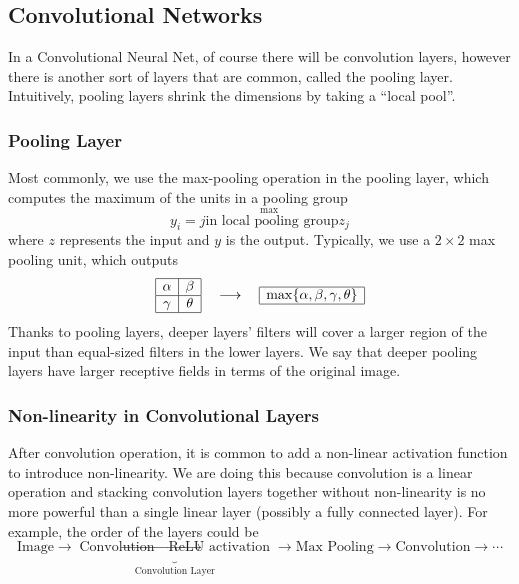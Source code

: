\documentclass[11pt]{article}
\begin{document}
\subsection{Convolutional Networks}
In a Convolutional Neural Net, of course there will be convolution layers, however there is another sort of layers that are common, called the pooling layer. Intuitively, pooling layers shrink the dimensions by taking a ``local pool''.
\subsubsection{Pooling Layer}
Most commonly, we use the max-pooling operation in the pooling layer, which computes the maximum of the units in a pooling group
\begin{equation}
    y_i = \overset{\max}{j \text{in local pooling group}}z_j
\end{equation}
where $z$ represents the input and $y$ is the output. Typically, we use a $2\times 2$ max pooling unit, which outputs
\begin{equation}
    \begin{array}{|c|c|}
        \hline
        \alpha & \beta \\
        \hline
        \gamma & \theta \\
        \hline
    \end{array} 
    \quad \longrightarrow
    \quad
    \begin{array}{|c|}
        \hline
            \max\{\alpha, \beta, \gamma, \theta\} \\
        \hline
    \end{array}
\end{equation}
Thanks to pooling layers, deeper layers' filters will cover a larger region of the input than equal-sized filters in the lower layers. We say that deeper pooling layers have larger receptive fields in terms of the original image. 

\subsubsection{Non-linearity in Convolutional Layers}
After convolution operation, it is common to add a non-linear activation function to introduce non-linearity. We are doing this because convolution is a linear operation and stacking convolution layers together without non-linearity is no more powerful than a single linear layer (possibly a fully connected layer). For example, the order of the layers could be
\begin{equation}
    \text{Image} \rightarrow \underbrace{\text{Convolution} \rightarrow \text{ReLU activation}}_{\text{Convolution Layer}} \rightarrow \text{Max Pooling} \rightarrow \text{Convolution} \rightarrow \cdots
\end{equation}
\end{document}
